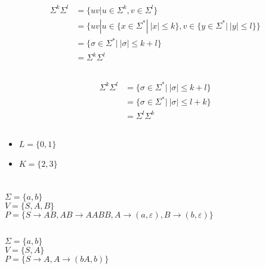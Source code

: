 \documentclass{article}
\begin{document}
\subsection{}
\begin{align*}
    \Sigma^k\Sigma^l&=\{uv | u\in\Sigma^k,v\in\Sigma^l\}\\
    &=\{uv|u\in\{x\in\Sigma^*|\ |x|\leq k\},v\in\{y\in\Sigma^*|\ |y|\leq l\}\}\\
    &=\{\sigma\in\Sigma^*|\ |\sigma|\leq k+l\}\\
    &=\Sigma^k\Sigma^l
\end{align*}
\subsection{}
\begin{align*}
    \Sigma^k\Sigma^l &=\{\sigma\in\Sigma^*|\ |\sigma|\leq k+l\}\\
    &=\{\sigma\in\Sigma^*|\ |\sigma|\leq l+k\}\\
    &=\Sigma^l\Sigma^k
\end{align*}
\subsection{}
\begin{itemize}
    \item{$L=\{0,1\}$}
    \item{$K=\{2,3\}$}
\end{itemize}
\section{}
\subsection{}
$\Sigma = \{a,b\}$\\
$V=\{S,A,B\}$\\
$P=\{S\rightarrow AB, AB\rightarrow AABB,
A \rightarrow (a,\varepsilon), B \rightarrow (b, \varepsilon)\}$
\subsection{}
$\Sigma = \{a,b\}$\\
$V=\{S,A\}$\\
$P=\{S\rightarrow A, A\rightarrow (bA, b)\}$
\subsection{}
\end{document}
